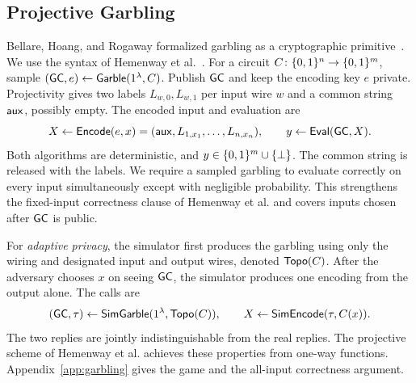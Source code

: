 \subsection{Projective Garbling}
\label{sec:garbling}

Bellare, Hoang, and Rogaway formalized garbling as a cryptographic
primitive~\cite{BellareHoangRogaway2012Foundations}.  We use the syntax of
Hemenway et al.~\cite[full version, Definition~1]{HemenwayEtAl2016AdaptiveGarbling}.
For a circuit $C\colon\{0,1\}^n\to\{0,1\}^m$, sample
$(\mathsf{GC},e)\mathrel{\leftarrow}\mathsf{Garble}(1^\lambda,C)$.  Publish $\mathsf{GC}$ and keep the
encoding key $e$ private.  Projectivity gives two labels $L_{w,0},L_{w,1}$
per input wire $w$ and a common string $\mathsf{aux}$, possibly empty.
The encoded input and evaluation are
\[
  X\gets\mathsf{Encode}(e,x)=(\mathsf{aux},L_{1,x_1},\ldots,L_{n,x_n}),
  \qquad y\gets\mathsf{Eval}(\mathsf{GC},X).
\]
Both algorithms are deterministic, and $y\in\{0,1\}^m\cup\{\bot\}$.
The common string is released with the labels.  We require a sampled garbling to evaluate correctly on every input
simultaneously except with negligible probability.  This strengthens the
fixed-input correctness clause of Hemenway et al. and covers inputs
chosen after $\mathsf{GC}$ is public.

For \emph{adaptive privacy}, the simulator first produces the garbling
using only the wiring and designated input and output wires, denoted
$\mathsf{Topo}(C)$.  After the adversary chooses $x$ on seeing $\mathsf{GC}$, the
simulator produces one encoding from the output alone.  The calls are
\[
  (\mathsf{GC},\tau)\mathrel{\leftarrow}\mathsf{SimGarble}(1^\lambda,\mathsf{Topo}(C)),
  \qquad X\mathrel{\leftarrow}\mathsf{SimEncode}(\tau,C(x)).
\]
The two replies are jointly indistinguishable from the real replies.
The projective scheme of Hemenway et al. achieves these properties from
one-way functions.  Appendix~\ref{app:garbling} gives the game and the
all-input correctness argument.
